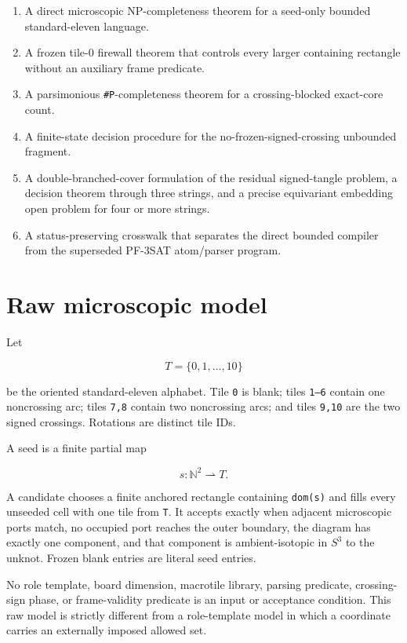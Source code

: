 \documentclass[11pt]{article}
\begin{document}
\begin{enumerate}
\item A direct microscopic NP-completeness theorem for a seed-only bounded
   standard-eleven language.
\item A frozen tile-0 firewall theorem that controls every larger containing
   rectangle without an auxiliary frame predicate.
\item A parsimonious \texttt{\#P}-completeness theorem for a crossing-blocked exact-core
   count.
\item A finite-state decision procedure for the no-frozen-signed-crossing
   unbounded fragment.
\item A double-branched-cover formulation of the residual signed-tangle problem,
   a decision theorem through three strings, and a precise equivariant
   embedding open problem for four or more strings.
\item A status-preserving crosswalk that separates the direct bounded compiler
   from the superseded PF-3SAT atom/parser program.
\end{enumerate}

\section{Raw microscopic model}

Let

\[
 T=\{0,1,\ldots,10\}
\]

be the oriented standard-eleven alphabet.  Tile \texttt{0} is blank; tiles \texttt{1--6}
contain one noncrossing arc; tiles \texttt{7,8} contain two noncrossing arcs; and
tiles \texttt{9,10} are the two signed crossings.  Rotations are distinct tile IDs.

A seed is a finite partial map

\[
 s:\mathbb N^2\rightharpoonup T.
\]

A candidate chooses a finite anchored rectangle containing \texttt{dom(s)} and fills
every unseeded cell with one tile from \texttt{T}.  It accepts exactly when adjacent
microscopic ports match, no occupied port reaches the outer boundary, the
diagram has exactly one component, and that component is ambient-isotopic in
$S^3$ to the unknot.  Frozen blank entries are literal seed entries.

No role template, board dimension, macrotile library, parsing predicate,
crossing-sign phase, or frame-validity predicate is an input or acceptance
condition.  This raw model is strictly different from a role-template model
in which a coordinate carries an externally imposed allowed set.
\end{document}
